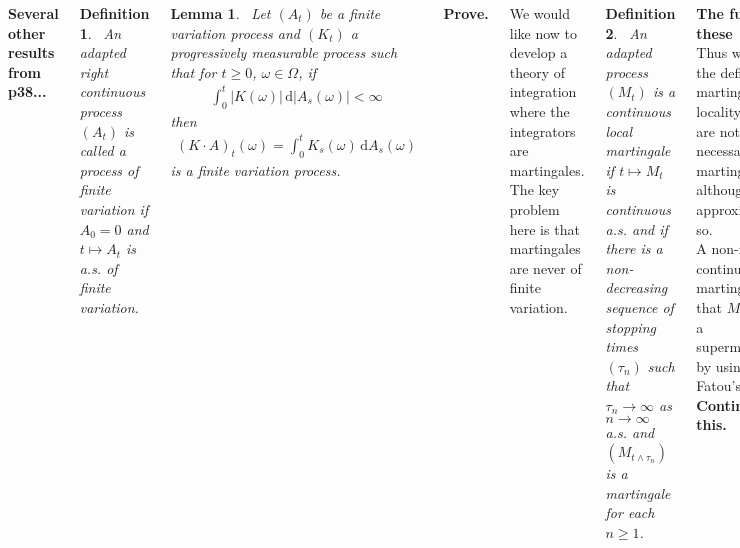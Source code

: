 \documentclass{tikzposter} %
\newtheorem{lemma}[theorem]{Lemma}
\newtheorem{definition}{Definition}
\begin{document}
\begin{columns}
{{    \textbf{Several other results from p38...} \\

    \begin{definition}
    \ An adapted right continuous process $(A_{t})$ is called a process of finite variation if $A_{0} = 0$ and $t \mapsto A_{t}$ is a.s. of finite variation.
    \end{definition}
    \hphantom{}

    \begin{lemma}
    \ Let $(A_{t})$ be a finite variation process and $(K_{t})$ a progressively measurable process such that for $t \ge 0$, $\omega \in \Omega$, if
    \begin{align*}
      \int_{0}^{t} |K(\omega)| \,\mathrm{d} |A_{s}(\omega)| < \infty
    \end{align*}
    then
    \begin{align*}
      (K \cdot A)_{t}(\omega) = \int_{0}^{t} K_{s}(\omega) \, \mathrm{d}A_{s}(\omega)
    \end{align*}
    is a finite variation process.
    \end{lemma}
    \hphantom{}

    \textbf{Prove.} \\
    }
    \hphantom{}

    We would like now to develop a theory of integration where the integrators are martingales. The key problem here is that martingales are never of finite variation. \\

    \begin{definition}
    \ An adapted process $(M_{t})$ is a continuous local martingale if $t \mapsto M_{t}$ is continuous a.s. and if there is a non-decreasing sequence of stopping times $(\tau_{n})$ such that $\tau_{n} \to \infty$ as $n \to \infty$ a.s. and $(M_{t \land \tau_{n}})$ is a martingale for each $n \ge 1$.
    \end{definition}
    \hphantom{}

    \textbf{The fuck are these} \\

    Thus we extend the definition of martingales to locality. These are not necessarily martingales, although are approximately so. \\

    A non-negative continuous local martingale such that $M_{0} \in L^{1}$ is a supermartingale by using Fatou's lemma. \textbf{Continue this.} \\

}
\end{columns}
\end{document}
